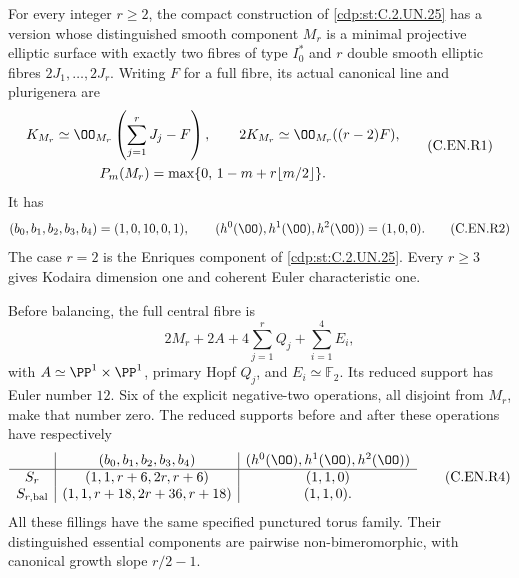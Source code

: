 
\begin{proposition}\label{cdp:st:C.2.UN.27}
For every integer $r\ge2$, the compact construction
of \ref{cdp:st:C.2.UN.25} has a version whose distinguished smooth
component $M_r$ is a minimal projective elliptic
surface with exactly two fibres of type $I_0^*$
and $r$ double smooth elliptic fibres $2J_1,\ldots,2J_r$.
Writing $F$ for a full fibre, its actual canonical
line and plurigenera are
\[
 \begin{gathered}
 K_{M_r}\simeq\OO_{M_r}\left(\sum_{j=1}^rJ_j-F\right),
 \qquad
 2K_{M_r}\simeq\OO_{M_r}((r-2)F),
 \\
 P_m(M_r)=\max\{0,\,1-m+r\lfloor m/2\rfloor\}.
 \end{gathered}
                                                               \tag{C.EN.R1}\label{cdp:eq:C.EN.R1}
\]
It has
\[
 (b_0,b_1,b_2,b_3,b_4)=(1,0,10,0,1),\qquad
 (h^0(\OO),h^1(\OO),h^2(\OO))=(1,0,0).
                                                               \tag{C.EN.R2}\label{cdp:eq:C.EN.R2}
\]
The case $r=2$ is the Enriques component of \ref{cdp:st:C.2.UN.25}.
Every $r\ge3$ gives Kodaira dimension one and
coherent Euler characteristic one.

Before balancing, the full central fibre is
\[
 2M_r+2A+4\sum_{j=1}^r Q_j+\sum_{i=1}^4E_i,
                                                               \tag{C.EN.R3}\label{cdp:eq:C.EN.R3}
\]
with $A\simeq\PP^1\times\PP^1$, primary Hopf
$Q_j$, and $E_i\simeq\mathbb F_2$.
Its reduced support has Euler number $12$.
Six of the explicit negative-two operations,
all disjoint from $M_r$, make that number zero.
The reduced supports before and after these
operations have respectively
\[
 \begin{array}{c|c|c}
 &(b_0,b_1,b_2,b_3,b_4)&(h^0(\OO),h^1(\OO),h^2(\OO))\\ \hline
 S_r&(1,1,r+6,2r,r+6)&(1,1,0)\\
 S_{r,\mathrm{bal}}&(1,1,r+18,2r+36,r+18)&(1,1,0).
 \end{array}                                             \tag{C.EN.R4}\label{cdp:eq:C.EN.R4}
\]
All these fillings have the same specified punctured
torus family. Their distinguished essential components
are pairwise non-bimeromorphic, with canonical growth
slope $r/2-1$.
\end{proposition}
